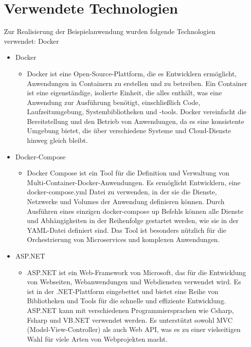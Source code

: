 \section{Verwendete Technologien}

Zur Realisierung der Beispielanwendung wurden folgende Technologien verwendet:
Docker

\begin{itemize}
    \item Docker
    \begin{itemize}
        \item Docker ist eine Open-Source-Plattform, die es Entwicklern ermöglicht, Anwendungen in Containern zu erstellen und zu betreiben. Ein Container ist eine eigenständige, isolierte Einheit, die alles enthält, was eine Anwendung zur Ausführung benötigt, einschließlich Code, Laufzeitumgebung, Systembibliotheken und -tools. Docker vereinfacht die Bereitstellung und den Betrieb von Anwendungen, da es eine konsistente Umgebung bietet, die über verschiedene Systeme und Cloud-Dienste hinweg gleich bleibt.
    \end{itemize}

    \item Docker-Compose
    \begin{itemize}
        \item Docker Compose ist ein Tool für die Definition und Verwaltung von Multi-Container-Docker-Anwendungen. Es ermöglicht Entwicklern, eine docker-compose.yml Datei zu verwenden, in der sie die Dienste, Netzwerke und Volumes der Anwendung definieren können. Durch Ausführen eines einzigen docker-compose up Befehls können alle Dienste und Abhängigkeiten in der Reihenfolge gestartet werden, wie sie in der YAML-Datei definiert sind. Das Tool ist besonders nützlich für die Orchestrierung von Microservices und komplexen Anwendungen.
    \end{itemize}
\newpage
    \item ASP.NET
    \begin{itemize}
        \item ASP.NET ist ein Web-Framework von Microsoft, das für die Entwicklung von Webseiten, Webanwendungen und Webdiensten verwendet wird. Es ist in der .NET-Plattform eingebettet und bietet eine Reihe von Bibliotheken und Tools für die schnelle und effiziente Entwicklung. ASP.NET kann mit verschiedenen Programmiersprachen wie Csharp, Fsharp und VB.NET verwendet werden. 
        Es unterstützt sowohl MVC (Model-View-Controller) als auch Web API, was es zu einer vielseitigen Wahl für viele Arten von Webprojekten macht.
    \end{itemize}


\end{itemize}
